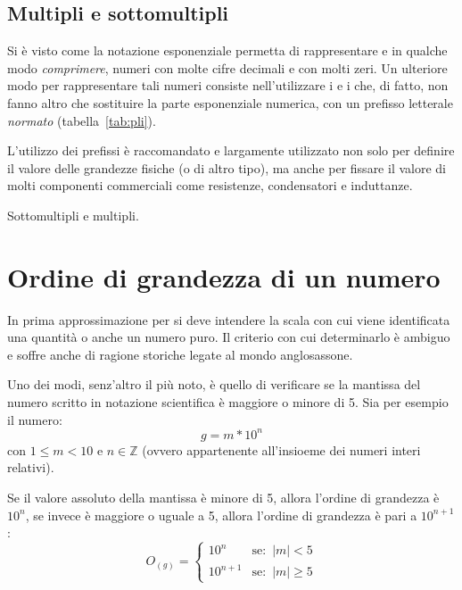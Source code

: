 					\subsection{Multipli e sottomultipli}

Si è visto come la notazione esponenziale permetta di rappresentare e in qualche modo \textit{comprimere}, numeri con molte cifre decimali e con molti zeri. Un ulteriore modo per rappresentare tali numeri consiste nell'utilizzare i  e i  che, di fatto, non fanno altro che sostituire la parte esponenziale numerica, con un prefisso letterale \textit{normato} (tabella~\ref{tab:pli}).

L'utilizzo dei prefissi è raccomandato e largamente utilizzato non solo per definire il valore delle grandezze fisiche (o di altro tipo), ma anche per fissare il valore di molti componenti commerciali come resistenze, condensatori e induttanze.
\begin{table}[htp!]
\begin{center}
\caption{Sottomultipli e multipli.}\label{tab:pli}
\multiplisottomultipli
\end{center}
\end{table}


				\section{Ordine di grandezza di un numero}

In prima approssimazione per  si deve intendere la scala con cui viene identificata una quantità o anche un numero puro. Il criterio con cui determinarlo è ambiguo e soffre anche di ragione storiche legate al mondo anglosassone.

Uno dei modi, senz'altro il più noto, è quello di verificare se la mantissa del numero scritto in notazione scientifica è maggiore o minore di 5. Sia per esempio il numero:
\[
 g = m*10^n
\]
con $1\leq m<10$ e $n\in\mathbb{Z}$ (ovvero appartenente all'insioeme dei numeri interi relativi).

Se il valore assoluto della mantissa è minore di 5, allora l'ordine di grandezza è $10^n$, se invece è maggiore o uguale a 5, allora l'ordine di grandezza è pari a $10^{n+1}$:
\[
 O_{(g)} = \begin{cases}
             10^n     & \text{se: }\, |m|<5 \\
             10^{n+1} & \text{se: }\, |m|\geq 5
           \end{cases}
\]

